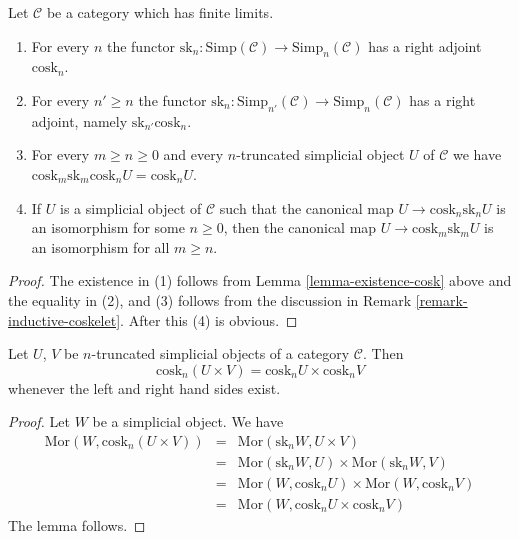 \begin{lemma}
\label{lemma-cosk-up}
Let $\mathcal{C}$ be a category which has finite limits.
\begin{enumerate}
\item For every $n$ the functor $\text{sk}_n : \text{Simp}(\mathcal{C})
\to \text{Simp}_n(\mathcal{C})$ has a right adjoint $\text{cosk}_n$.
\item For every $n' \geq n$ the functor
$\text{sk}_n : \text{Simp}_{n'}(\mathcal{C}) \to \text{Simp}_n(\mathcal{C})$
has a right adjoint, namely $\text{sk}_{n'}\text{cosk}_n$.
\item For every $m \geq n \geq 0$ and every $n$-truncated simplicial
object $U$ of $\mathcal{C}$ we have
$\text{cosk}_m \text{sk}_m \text{cosk}_n U = \text{cosk}_n U$.
\item If $U$ is a simplicial object of $\mathcal{C}$ such that
the canonical map
$U \to \text{cosk}_n \text{sk}_nU$
is an isomorphism for some $n \geq 0$, then the canonical map
$U \to \text{cosk}_m \text{sk}_mU$
is an isomorphism for all $m \geq n$.
\end{enumerate}
\end{lemma}

\begin{proof}
The existence in (1) follows from Lemma \ref{lemma-existence-cosk} above
and the equality in (2), and (3) follows from the discussion
in Remark \ref{remark-inductive-coskelet}. After this (4) is obvious.
\end{proof}

\begin{lemma}
\label{lemma-cosk-product}
Let $U$, $V$ be $n$-truncated simplicial objects of a
category $\mathcal{C}$. Then
$$
\text{cosk}_n (U \times V) = \text{cosk}_nU \times \text{cosk}_nV
$$
whenever the left and right hand sides exist.
\end{lemma}

\begin{proof}
Let $W$ be a simplicial object. We have
\begin{eqnarray*}
\text{Mor}(W, \text{cosk}_n (U \times V))
& = &
\text{Mor}(\text{sk}_n W, U \times V) \\
& = &
\text{Mor}(\text{sk}_n W, U)
\times
\text{Mor}(\text{sk}_nW, V) \\
& = &
\text{Mor}(W, \text{cosk}_n U)
\times
\text{Mor}(W, \text{cosk}_n V) \\
& = &
\text{Mor}(W, \text{cosk}_n U \times \text{cosk}_n V)
\end{eqnarray*}
The lemma follows.
\end{proof}

